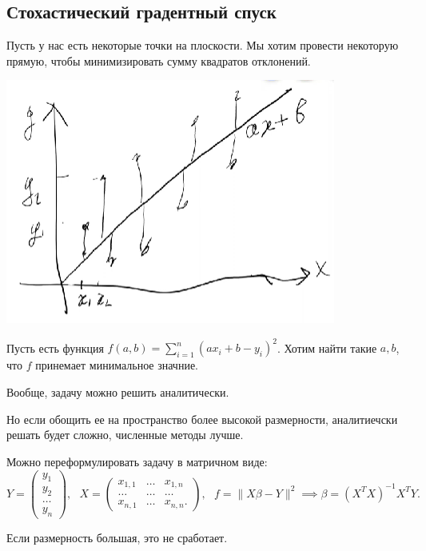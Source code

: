 \subsection{Стохастический градентный спуск}
\begin{problem}
    Пусть у нас есть некоторые точки на плоскости. Мы хотим провести некоторую прямую, чтобы минимизировать сумму квадратов отклонений.

    \begin{center}
        \includegraphics[scale=0.5]{img/linear_regression_problem}
    \end{center}

    Пусть есть функция $f(a, b) = \sum_{i=1}^n \left( a x_i + b - y_i \right)^2$. Хотим найти такие $a, b$, что $f$ принемает минимальное значние.

    Вообще, задачу можно решить аналитически.

    Но если обощить ее  на пространство более высокой размерности, аналитиечски решать будет сложно, численные методы лучше.

    Можно переформулировать задачу в матричном виде:
    \[Y = \begin{pmatrix}
        y_1\\ y_2\\ \dots\\ y_n 
    \end{pmatrix}, ~~~X = \begin{pmatrix}
        x_{1,1} & \dots & x_{1,n}\\
        \dots & \dots & \dots\\
        x_{n,1} & \dots & x_{n,n}.
    \end{pmatrix}, ~~~
    f = \| X \beta - Y \| ^2 \implies
    \beta = \left( X^T X \right) ^{-1} X ^T Y.\]

    Если размерность большая, это не сработает.
\end{problem}

